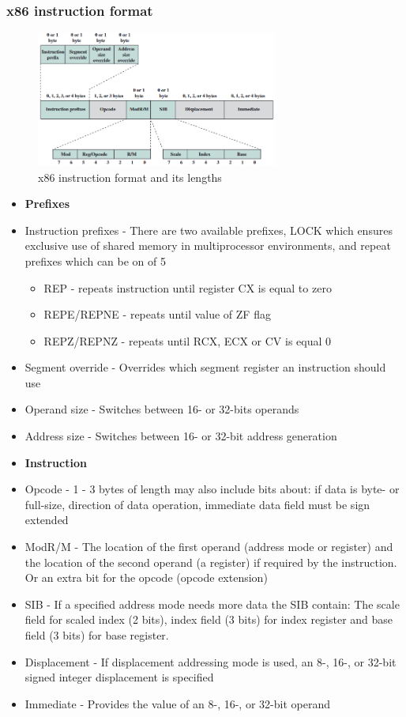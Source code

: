 \documentclass[12pt, a4paper]{article}
\begin{document}
			\subsubsection{x86 instruction format}
				\begin{figure}[h!]
					\centering
					\includegraphics[width=300px]{assets/x86instructionFormat.png}
					\caption{x86 instruction format and its lengths}
				\end{figure}
				\begin{itemize}
					\item \textbf{Prefixes}
					\item Instruction prefixes - There are two available prefixes, LOCK which ensures exclusive use of shared memory in multiprocessor environments, and repeat prefixes which can be on of 5
					\begin{itemize}
						\item REP - repeats instruction until register CX is equal to zero
						\item REPE/REPNE - repeats until value of ZF flag
						\item REPZ/REPNZ - repeats until RCX, ECX or CV is equal 0
					\end{itemize}
					\item  Segment override - Overrides which segment register an instruction should use
					\item Operand size - Switches between 16- or 32-bits operands
					\item Address size - Switches between 16- or 32-bit address generation
					\item \textbf{Instruction}
					\item Opcode - 1 - 3 bytes of length may also include bits about: if data is byte- or full-size, direction of data operation, immediate data field must be sign extended
					\item ModR/M - The location of the first operand (address mode or register) and the location of the second operand (a register) if required by the instruction. Or an extra bit for the opcode (opcode extension)
					\item SIB - If a specified address mode needs more data the SIB contain: The scale field for scaled index (2 bits), index field (3 bits) for index register and base field (3 bits) for base register.
					\item Displacement - If displacement addressing mode is used, an 8-, 16-, or 32-bit signed integer displacement is specified
					\item Immediate - Provides the value of an 8-, 16-, or 32-bit operand
				\end{itemize} 
\end{document}
